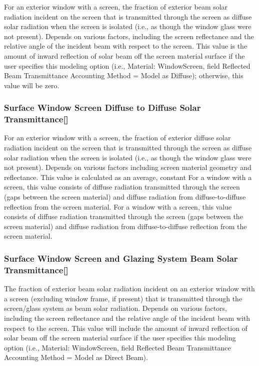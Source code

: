 For an exterior window with a screen, the fraction of exterior beam solar radiation incident on the screen that is transmitted through the screen as diffuse solar radiation when the screen is isolated (i.e., as though the window glass were not present). Depends on various factors, including the screen reflectance and the relative angle of the incident beam with respect to the screen. This value is the amount of inward reflection of solar beam off the screen material surface if the user specifies this modeling option (i.e., Material: WindowScreen, field Reflected Beam Transmittance Accounting Method = Model as Diffuse); otherwise, this value will be zero.

\subsubsection{Surface Window Screen Diffuse to Diffuse Solar Transmittance{[]}}\label{surface-window-screen-diffuse-to-diffuse-solar-transmittance}

For an exterior window with a screen, the fraction of exterior diffuse solar radiation incident on the screen that is transmitted through the screen as diffuse solar radiation when the screen is isolated (i.e., as though the window glass were not present). Depends on various factors including screen material geometry and reflectance. This value is calculated as an average, constant For a window with a screen, this value consists of diffuse radiation transmitted through the screen (gaps between the screen material) and diffuse radiation from diffuse-to-diffuse reflection from the screen material. For a window with a screen, this value consists of diffuse radiation transmitted through the screen (gaps between the screen material) and diffuse radiation from diffuse-to-diffuse reflection from the screen material.

\subsubsection{Surface Window Screen and Glazing System Beam Solar Transmittance{[]}}\label{surface-window-screen-and-glazing-system-beam-solar-transmittance}

The fraction of exterior beam solar radiation incident on an exterior window with a screen (excluding window frame, if present) that is transmitted through the screen/glass system as beam solar radiation. Depends on various factors, including the screen reflectance and the relative angle of the incident beam with respect to the screen. This value will include the amount of inward reflection of solar beam off the screen material surface if the user specifies this modeling option (i.e., Material: WindowScreen, field Reflected Beam Transmittance Accounting Method = Model as Direct Beam).

